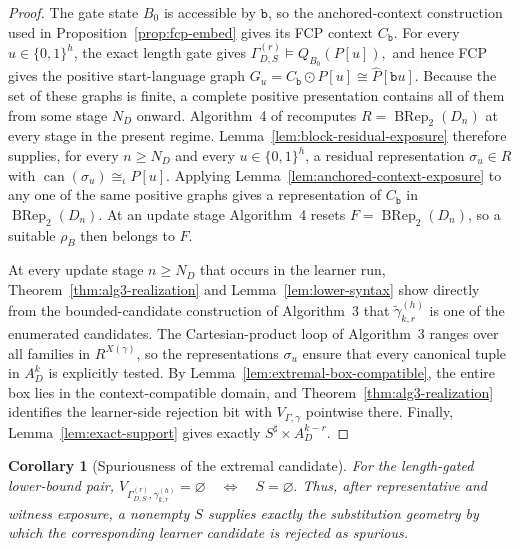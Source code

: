 \documentclass[11pt]{article}
\newtheorem{corollary}[theorem]{Corollary}
\theoremstyle{definition}
\theoremstyle{remark}
\begin{document}
\begin{proof}
The gate state \(B_0\) is accessible by \(\mathtt b\), so the anchored-context
construction used in Proposition~\ref{prop:fcp-embed} gives its FCP context
\(C_{\mathtt b}\).  For every \(u\in\{0,1\}^h\), the exact length gate gives
\(\Gamma_{D,S}^{(r)}\models Q_{B_0}(P[u]),\)
and hence FCP gives the positive start-language graph
\(G_u=C_{\mathtt b}\odot P[u] \cong\widehat P[\mathtt b u].\)
Because the set of these graphs is finite, a complete positive presentation
contains all of them from some stage \(N_D\) onward.  Algorithm~4 of
\cite{ShoudaiEtAl2026} recomputes
\(R=\operatorname{BRep}_2(D_n)\)
at every stage in the present regime.  Lemma~\ref{lem:block-residual-exposure}
therefore supplies, for every \(n\ge N_D\) and every \(u\in\{0,1\}^h\), a
residual representation \(\sigma_u\in R\) with
\(\operatorname{can}(\sigma_u)\cong_\iota P[u]\).  Applying
Lemma~\ref{lem:anchored-context-exposure} to any one of the same positive
graphs gives a representation of \(C_{\mathtt b}\) in
\(\operatorname{BRep}_2(D_n)\).  At an update stage Algorithm~4 resets
\(F=\operatorname{BRep}_2(D_n)\), so a suitable \(\rho_B\) then belongs to
\(F\).

At every update stage \(n\ge N_D\) that occurs in the learner run,
Theorem~\ref{thm:alg3-realization} and
Lemma~\ref{lem:lower-syntax} show directly from the bounded-candidate
construction of Algorithm~3 that
\(\widetilde\gamma_{k,r}^{(h)}\) is one of the enumerated candidates.
The Cartesian-product loop of Algorithm~3 ranges over all families in
\(R^{X(\gamma)}\), so the representations \(\sigma_u\) ensure that every
canonical tuple in \(A_D^k\) is explicitly tested.  By
Lemma~\ref{lem:extremal-box-compatible}, the entire box lies in the
context-compatible domain, and Theorem~\ref{thm:alg3-realization} identifies
the learner-side rejection bit with \(V_{\Gamma,\gamma}\) pointwise there.
Finally, Lemma~\ref{lem:exact-support} gives exactly
\(S^\sharp\times A_D^{k-r}.\)
\end{proof}

\begin{corollary}[Spuriousness of the extremal candidate]
For the length-gated lower-bound pair,
\(V_{\Gamma_{D,S}^{(r)},\gamma_{k,r}^{(h)}}=\varnothing \quad\Longleftrightarrow\quad S=\varnothing.\)
Thus, after representative and witness exposure, a nonempty \(S\) supplies
exactly the substitution geometry by which the corresponding learner
candidate is rejected as spurious.
\end{corollary}
\end{document}
